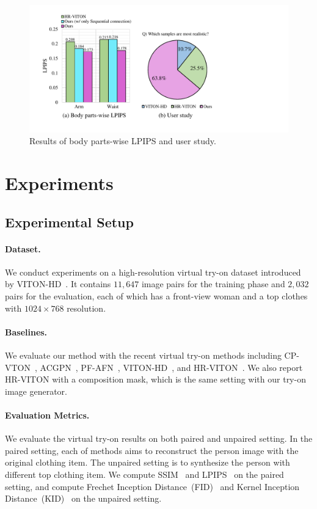 \documentclass[letterpaper]{article} %
\begin{document}
\begin{figure}[t!]
\centering
\includegraphics[width=\linewidth]{fig/fig4.pdf}
\caption{Results of body parts-wise LPIPS and user study.}
\label{LPIPS_parts_user_study}
\end{figure}

\section{Experiments}
\label{sec_eval}
\subsection{Experimental Setup}

\paragraph{Dataset.} We conduct experiments on a high-resolution virtual try-on dataset introduced by VITON-HD~\cite{choi2021viton}.
It contains $11,647$ image pairs for the training phase and $2,032$ pairs for the evaluation, each of which has a front-view woman and a top clothes with $1024 \times 768$ resolution.

\paragraph{Baselines.} We evaluate our method with the recent virtual try-on methods including CP-VTON~\cite{wang2018toward}, ACGPN~\cite{yang2020towards}, PF-AFN~\cite{ge2021parser}, VITON-HD~\cite{choi2021viton}, and HR-VITON~\cite{lee2022hrviton}.
We also report HR-VITON with a composition mask, which is the same setting with our try-on image generator.

\paragraph{Evaluation Metrics.} We evaluate the virtual try-on results on both paired and unpaired setting.
In the paired setting, each of methods aims to reconstruct the person image with the original clothing item.
The unpaired setting is to synthesize the person with different top clothing item.
We compute SSIM~\cite{wang2004image} and LPIPS~\cite{zhang2018perceptual} on the paired setting, and compute Frechet Inception Distance~(FID)~\cite{heusel2017gans} and Kernel Inception Distance~(KID)~\cite{bińkowski2018demystifying} on the unpaired setting.
\end{document}
